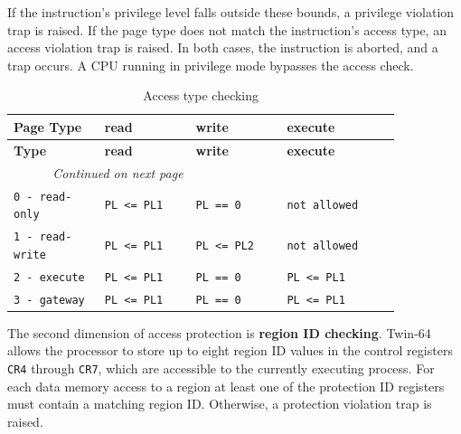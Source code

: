 If the instruction’s privilege level falls outside these bounds, a privilege violation trap is raised. If the page type does not match the instruction’s access type, an access violation trap is raised. In both cases, the instruction is aborted, and a trap occurs. A CPU running in privilege mode bypasses the access check. 

\begin{longtable}{@{}p{0.2\linewidth}p{0.2\linewidth}p{0.2\linewidth}p{0.25\linewidth}@{}}
    \caption{Access type checking} \\
    \toprule
    \textbf{Page Type} & \textbf{read} & \textbf{write} & \textbf{execute} \\
    \midrule
    \endfirsthead
    \toprule
    \textbf{Type} & \textbf{read} & \textbf{write} & \textbf{execute} \\
    \midrule
    \endhead
    \midrule
    \multicolumn{2}{r}{\textit{Continued on next page}} \\
    \midrule
    \endfoot
    \bottomrule
    \endlastfoot
    \texttt{0 - read-only} & \texttt{PL <= PL1} & \texttt{PL == 0} & \texttt{not allowed} \\
    \midrule 
    \texttt{1 - read-write} & \texttt{PL <= PL1} & \texttt{PL <= PL2} & \texttt{not allowed} \\
    \midrule 
    \texttt{2 - execute} & \texttt{PL <= PL1} & \texttt{PL == 0} & \texttt{PL <= PL1} \\
    \midrule 
    \texttt{3 - gateway} & \texttt{PL <= PL1} & \texttt{PL == 0} & \texttt{PL <= PL1} \\
\end{longtable}


The second dimension of access protection is \textbf{region ID checking}. Twin-64 allows the processor to store up to eight region ID values in the control registers \texttt{CR4} through \texttt{CR7}, which are accessible to the currently executing process. For each data memory access to a region at least one of the protection ID registers must contain a matching region ID. Otherwise, a protection violation trap is raised.


